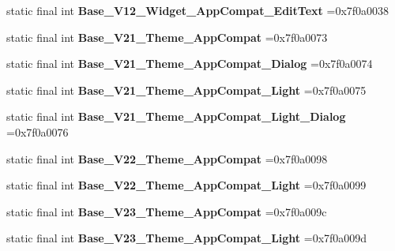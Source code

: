 \begin{DoxyCompactItemize}
static final int {\bfseries Base\+\_\+\+V12\+\_\+\+Widget\+\_\+\+App\+Compat\+\_\+\+Edit\+Text} =0x7f0a0038
\item 
\mbox{\label{classproject4_1_1xaria_1_1R_1_1style_abfff3e1ea109dd7244d152b938e5cc83}} 
static final int {\bfseries Base\+\_\+\+V21\+\_\+\+Theme\+\_\+\+App\+Compat} =0x7f0a0073
\item 
\mbox{\label{classproject4_1_1xaria_1_1R_1_1style_a1c9dc0ef348df69448480c468601b64e}} 
static final int {\bfseries Base\+\_\+\+V21\+\_\+\+Theme\+\_\+\+App\+Compat\+\_\+\+Dialog} =0x7f0a0074
\item 
\mbox{\label{classproject4_1_1xaria_1_1R_1_1style_a0ef1f4c0e1747d45bc42010468f877f6}} 
static final int {\bfseries Base\+\_\+\+V21\+\_\+\+Theme\+\_\+\+App\+Compat\+\_\+\+Light} =0x7f0a0075
\item 
\mbox{\label{classproject4_1_1xaria_1_1R_1_1style_a6ea6441bb836d3d3516ced9682292cde}} 
static final int {\bfseries Base\+\_\+\+V21\+\_\+\+Theme\+\_\+\+App\+Compat\+\_\+\+Light\+\_\+\+Dialog} =0x7f0a0076
\item 
\mbox{\label{classproject4_1_1xaria_1_1R_1_1style_aa91e67815d296b4356f88d8cead61bb5}} 
static final int {\bfseries Base\+\_\+\+V22\+\_\+\+Theme\+\_\+\+App\+Compat} =0x7f0a0098
\item 
\mbox{\label{classproject4_1_1xaria_1_1R_1_1style_a54346182a90db3ed54040263e8d1dccb}} 
static final int {\bfseries Base\+\_\+\+V22\+\_\+\+Theme\+\_\+\+App\+Compat\+\_\+\+Light} =0x7f0a0099
\item 
\mbox{\label{classproject4_1_1xaria_1_1R_1_1style_acb0dc4acd5ec7c4584c78cfdae56b6c9}} 
static final int {\bfseries Base\+\_\+\+V23\+\_\+\+Theme\+\_\+\+App\+Compat} =0x7f0a009c
\item 
\mbox{\label{classproject4_1_1xaria_1_1R_1_1style_a362aacef6c5964792652f070ac9cb290}} 
static final int {\bfseries Base\+\_\+\+V23\+\_\+\+Theme\+\_\+\+App\+Compat\+\_\+\+Light} =0x7f0a009d

\end{DoxyCompactItemize}
